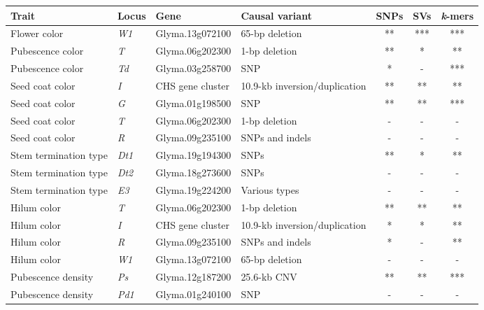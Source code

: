 \documentclass[doublespacing]{bmcart}
\begin{document}
\begin{backmatter}
\begin{table}[p]
	\footnotesize
	\centering
	\begin{threeparttable}
		\begin{tabular}{llllccc}
		\toprule Trait & Locus & Gene & Causal variant & SNPs\tnote{a} & SVs\tnote{b} & \textit{k}-mers \\ \midrule
		Flower color & \textit{W1} & Glyma.13g072100 & 65-bp deletion \citep{zabala2007} & ** & *** & *** \\
		Pubescence color & \textit{T} & Glyma.06g202300 & 1-bp deletion \citep{zabala2003} & ** & * & ** \\
		Pubescence color & \textit{Td} & Glyma.03g258700 & SNP \citep{yan2020} & * & - & *** \\
		Seed coat color & \textit{I} & CHS gene cluster & 10.9-kb inversion/duplication \citep{tuteja2008} & ** & ** & ** \\
		Seed coat color & \textit{G} & Glyma.01g198500 & SNP \citep{wang2018} & ** & ** & *** \\
		Seed coat color\tnote{c} & \textit{T} & Glyma.06g202300 & 1-bp deletion \citep{zabala2003} & - & - & - \\
		Seed coat color\tnote{c} & \textit{R} & Glyma.09g235100 & SNPs and indels \citep{gillman2011} & - & - & - \\
		Stem termination type & \textit{Dt1} & Glyma.19g194300 & SNPs \citep{liu2010} & ** & * & ** \\
		Stem termination type\tnote{c} & \textit{Dt2} & Glyma.18g273600 & SNPs \citep{ping2014} & - & - & - \\
		Stem termination type\tnote{c} & \textit{E3} & Glyma.19g224200 & Various types \citep{tardivel2019} & - & - & - \\
		Hilum color\tnote{c} & \textit{T} & Glyma.06g202300 & 1-bp deletion \citep{zabala2003} & ** & ** & ** \\
		Hilum color\tnote{c} & \textit{I} & CHS gene cluster & 10.9-kb inversion/duplication \citep{tuteja2008} & * & * & ** \\
		Hilum color & \textit{R} & Glyma.09g235100 & SNPs and indels \citep{gillman2011} & * & - & ** \\
		Hilum color\tnote{c} & \textit{W1} & Glyma.13g072100 & 65-bp deletion \citep{zabala2007} & - & - & - \\
		Pubescence density & \textit{Ps} & Glyma.12g187200 & 25.6-kb CNV \citep{liu2020ps} & ** & ** & *** \\
		Pubescence density\tnote{c} & \textit{Pd1} & Glyma.01g240100 & SNP \citep{liu2020ps} & - & - & - \\

\end{tabular}
\end{threeparttable}
\end{table}
\end{backmatter}
\end{document}
